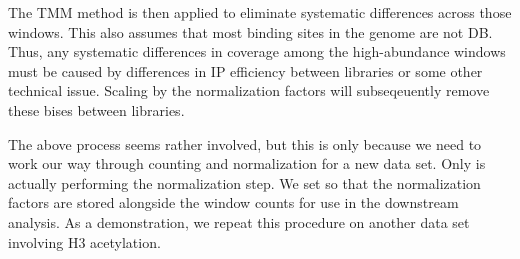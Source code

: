 \documentclass{report}\usepackage[]{graphicx}\usepackage[usenames,dvipsnames]{color}
\newcommand{\hlnum}[1]{\textcolor[rgb]{0.816,0.125,0.439}{#1}}%
\newcommand{\hlstr}[1]{\textcolor[rgb]{0.251,0.627,0.251}{#1}}%
\newcommand{\hlopt}[1]{\textcolor[rgb]{0,0,0}{#1}}%
\newcommand{\hlstd}[1]{\textcolor[rgb]{0.251,0.251,0.251}{#1}}%
\newcommand{\hlkwb}[1]{\textcolor[rgb]{0,0,0}{#1}}%
\newcommand{\hlkwc}[1]{\textcolor[rgb]{0.251,0.251,0.251}{#1}}%
\newcommand{\hlkwd}[1]{\textcolor[rgb]{0.878,0.439,0.125}{#1}}%
\newenvironment{knitrout}{}{} %
\begin{document}
\begin{knitrout}
\color{fgcolor}
\end{knitrout}

The TMM method is then applied to eliminate systematic differences across those windows.
This also assumes that most binding sites in the genome are not DB.
Thus, any systematic differences in coverage among the high-abundance windows must be caused by differences in IP efficiency between libraries or some other technical issue.
Scaling by the normalization factors will subseqeuently remove these bises between libraries. 

\begin{knitrout}
\color{fgcolor}
\end{knitrout}

The above process seems rather involved, but this is only because we need to work our way through counting and normalization for a new data set.
Only  is actually performing the normalization step.
We set  so that the normalization factors are stored alongside the window counts for use in the downstream  analysis.
As a demonstration, we repeat this procedure on another data set involving H3 acetylation.
\end{document}
